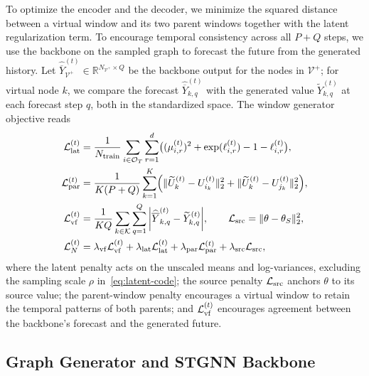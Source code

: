 \documentclass[runningheads,a4paper]{llncs}
\begin{document}
To optimize the encoder and the decoder, we minimize the squared distance between a virtual window and its two parent windows together with the latent regularization term. To encourage temporal consistency across all $P+Q$ steps, we use the backbone on the sampled graph to forecast the future from the generated history. Let $\widehat{\overline Y}_{\mathcal V^{+}}^{(t)}\in\mathbb R^{N_{\mathcal V^{+}}\times Q}$ be the backbone output for the nodes in $\mathcal V^{+}$; for virtual node $k$, we compare the forecast $\widehat{\overline Y}_{k,q}^{(t)}$ with the generated value $\widetilde Y_{k,q}^{(t)}$ at each forecast step $q$, both in the standardized space. The window generator objective reads
\begin{equation}
\begin{aligned}
  \mathcal L_{\rm lat}^{(t)}&=\frac{1}{\text{$N_{\mathrm{train}}$}}\sum_{i\in\mathcal O_{T}}\sum_{r=1}^{d}
      \bigl((\mu_{i,r}^{(t)})^2+\exp(\ell_{i,r}^{(t)})-1-\ell_{i,r}^{(t)}\bigr),\\
  \mathcal L_{\rm par}^{(t)}&=\frac{1}{K(P+Q)}\sum_{k=1}^{K}
      \Bigl(\|\widetilde U_k^{(t)}-U_{i_k}^{(t)}\|_2^2+\|\widetilde U_k^{(t)}-U_{j_k}^{(t)}\|_2^2\Bigr),\\
  \mathcal L_{\rm vf}^{(t)}&=
      \text{$\displaystyle\frac{1}{KQ}\sum_{k\in\mathcal K}\sum_{q=1}^{Q}
      \left|\widehat{\overline Y}_{k,q}^{(t)}-\widetilde Y_{k,q}^{(t)}\right|$},
      \qquad\mathcal L_{\rm src}=\|\theta-\theta_S\|_2^2,\\
  \mathcal L_N^{(t)}&=\lambda_{\rm vf}\mathcal L_{\rm vf}^{(t)}+\lambda_{\rm lat}\mathcal L_{\rm lat}^{(t)}
      +\lambda_{\rm par}\mathcal L_{\rm par}^{(t)}+\lambda_{\rm src}\mathcal L_{\rm src},
\end{aligned}
  \label{eq:node-objectives}
\end{equation}
where the latent penalty acts on the unscaled means and log-variances, excluding the sampling scale $\rho$ in~\eqref{eq:latent-code}; the source penalty $\mathcal L_{\rm src}$ anchors $\theta$ to its source value; the parent-window penalty encourages a virtual window to retain the temporal patterns of both parents; and $\mathcal L_{\rm vf}^{(t)}$ encourages agreement between the backbone's forecast and the generated future.

\subsection{Graph Generator and STGNN Backbone}
\label{sec:graph-generator}
\end{document}
